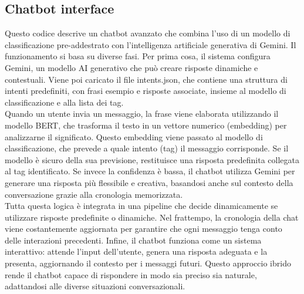 \documentclass[12pt, letterpaper]{article}
\begin{document}
\subsection{Chatbot interface}
Questo codice descrive un chatbot avanzato che combina l'uso di un modello di classificazione pre-addestrato con l'intelligenza artificiale generativa di Gemini. Il funzionamento si basa su diverse fasi. Per prima cosa, il sistema configura Gemini, un modello AI generativo che può creare risposte dinamiche e contestuali. Viene poi caricato il file intents.json, che contiene una struttura di intenti predefiniti, con frasi esempio e risposte associate, insieme al modello di classificazione e alla lista dei tag.\\
Quando un utente invia un messaggio, la frase viene elaborata utilizzando il modello BERT, che trasforma il testo in un vettore numerico (embedding) per analizzarne il significato. Questo embedding viene passato al modello di classificazione, che prevede a quale intento (tag) il messaggio corrisponde. Se il modello è sicuro della sua previsione, restituisce una risposta predefinita collegata al tag identificato. Se invece la confidenza è bassa, il chatbot utilizza Gemini per generare una risposta più flessibile e creativa, basandosi anche sul contesto della conversazione grazie alla cronologia memorizzata.\\
Tutta questa logica è integrata in una pipeline che decide dinamicamente se utilizzare risposte predefinite o dinamiche. Nel frattempo, la cronologia della chat viene costantemente aggiornata per garantire che ogni messaggio tenga conto delle interazioni precedenti. Infine, il chatbot funziona come un sistema interattivo: attende l'input dell'utente, genera una risposta adeguata e la presenta, aggiornando il contesto per i messaggi futuri. Questo approccio ibrido rende il chatbot capace di rispondere in modo sia preciso sia naturale, adattandosi alle diverse situazioni conversazionali.

\newpage
\end{document}
